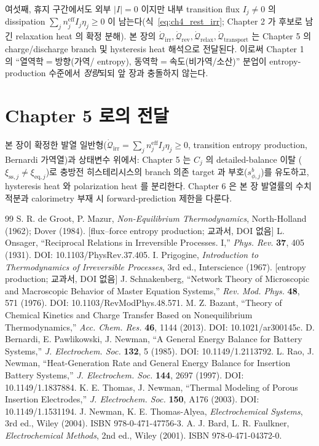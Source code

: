 \documentclass[11pt,a4paper]{article}
\newcommand{\eff}{\mathrm{eff}}
\newcommand{\eq}{\mathrm{eq}}
\newcommand{\irr}{\mathrm{irr}}
\newcommand{\rev}{\mathrm{rev}}
\newcommand{\rlx}{\mathrm{relax}}
\newcommand{\transp}{\mathrm{transport}}
\newcommand{\sstat}{\mathrm{ss}}
\newcommand{\brk}{\discretionary{}{}{}}%
\begin{document}
여섯째, 휴지 구간에서도 외부 $|I|=0$ 이지만 내부 transition flux $I_j\ne0$ 의 dissipation $\sum_j n_j^{\eff}I_j\eta_j\ge0$
이 남는다(식~\eqref{eq:ch4_rest_irr}; Chapter 2 가 후보로 남긴 relaxation heat 의 확정 분해). 본 장의
$\dot{\mathcal Q}_{\irr},\dot{\mathcal Q}_{\rev},\dot{\mathcal Q}_{\rlx},\dot{\mathcal Q}_{\transp}$ 는 Chapter 5
의 charge/discharge branch 및 hysteresis heat 해석으로 전달된다. 이로써 Chapter 1 의 ``열역학$=$방향(가역/
entropy), 동역학$=$속도(비가역/소산)'' 분업이 entropy-production 수준에서 \emph{정량}되되 앞 장과 충돌하지 않는다.

\section*{Chapter 5 로의 전달}
본 장이 확정한 발열 일반형($\dot{\mathcal Q}_\irr=\sum_j n_j^{\eff}I_j\eta_j\ge0$, transition entropy
production, Bernardi 가역열)과 상태변수 위에서: Chapter 5 는 $C_j$ 의 detailed-balance 이탈
($\xi_{\sstat,j}\ne\xi_{\eq,j}$)로 충방전 히스테리시스의 branch 의존 target 과 부호($s_{\phi,j}^b$)를 유도하고,
hysteresis heat 와 polarization heat 를 분리한다. Chapter 6 은 본 장 발열률의 수치 적분과 calorimetry 부재 시
forward-prediction 제한을 다룬다.

\begin{thebibliography}{99}
 S. R. de Groot, P. Mazur, \emph{Non-Equilibrium Thermodynamics},
  North-Holland (1962); Dover (1984). [flux--force entropy production; 교과서, DOI 없음]
 L. Onsager, ``Reciprocal Relations in Irreversible Processes. I,'' \emph{Phys. Rev.}
  \textbf{37}, 405 (1931). DOI: 10.1103/\brk PhysRev.37.405.
 I. Prigogine, \emph{Introduction to Thermodynamics of Irreversible Processes},
  3rd ed., Interscience (1967). [entropy production; 교과서, DOI 없음]
 J. Schnakenberg, ``Network Theory of Microscopic and Macroscopic Behavior of
  Master Equation Systems,'' \emph{Rev. Mod. Phys.} \textbf{48}, 571 (1976). DOI: 10.1103/\brk RevModPhys.48.571.
 M. Z. Bazant, ``Theory of Chemical Kinetics and Charge Transfer Based on
  Nonequilibrium Thermodynamics,'' \emph{Acc. Chem. Res.} \textbf{46}, 1144 (2013). DOI: 10.1021/\brk ar300145c.
 D. Bernardi, E. Pawlikowski, J. Newman, ``A General Energy Balance for Battery
  Systems,'' \emph{J. Electrochem. Soc.} \textbf{132}, 5 (1985). DOI: 10.1149/\brk 1.2113792.
 L. Rao, J. Newman, ``Heat-Generation Rate and General Energy Balance for Insertion
  Battery Systems,'' \emph{J. Electrochem. Soc.} \textbf{144}, 2697 (1997). DOI: 10.1149/\brk 1.1837884.
 K. E. Thomas, J. Newman, ``Thermal Modeling of Porous Insertion Electrodes,''
  \emph{J. Electrochem. Soc.} \textbf{150}, A176 (2003). DOI: 10.1149/\brk 1.1531194.
 J. Newman, K. E. Thomas-Alyea, \emph{Electrochemical Systems}, 3rd ed., Wiley (2004).
  ISBN 978-0-\brk 471-47756-3.
 A. J. Bard, L. R. Faulkner, \emph{Electrochemical Methods}, 2nd ed., Wiley (2001).
  ISBN 978-0-\brk 471-04372-0.
\end{thebibliography}
\end{document}

